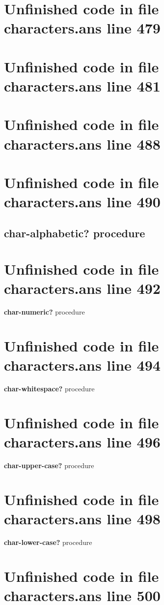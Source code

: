 \documentclass[twoside,9pt]{report}
\begin{document}
\section{Unfinished code in file characters.ans line 479}
\section{Unfinished code in file characters.ans line 481}
\section{Unfinished code in file characters.ans line 488}
\section{Unfinished code in file characters.ans line 490}
\subsection{char-alphabetic? procedure}
\label{char-alphabetic?-procedure}
\section{Unfinished code in file characters.ans line 492}

\noindent \textbf{char-numeric?} procedure

\section{Unfinished code in file characters.ans line 494}

\noindent \textbf{char-whitespace?} procedure

\section{Unfinished code in file characters.ans line 496}

\noindent \textbf{char-upper-case?} procedure

\section{Unfinished code in file characters.ans line 498}

\noindent \textbf{char-lower-case?} procedure

\section{Unfinished code in file characters.ans line 500}
\end{document}
